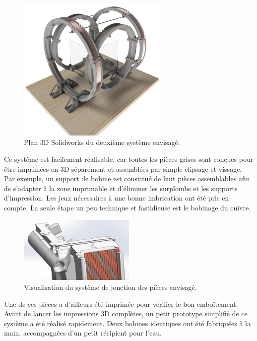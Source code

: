 \documentclass{article}
\begin{document}
    \begin{figure}[H]
        \centering
            \includegraphics[width = 0.65\textwidth]{Images/Proto2.PNG}
            \caption{Plan 3D Solidworks du deuxième système envisagé.}
            \label{fig:sytèmeV2}
        \end{figure}
\noindent
Ce système est facilement réalisable, car toutes les pièces grises sont conçues pour être imprimées en 3D séparément et assemblées par simple clipsage et vissage. Par exemple, un support de bobine est constitué de huit pièces assemblables afin de s'adapter à la zone imprimable et d'éliminer les surplombs et les supports d'impression. Les jeux nécessaires à une bonne imbrication ont été pris en compte. La seule étape un peu technique et fastidieuse est le bobinage du cuivre.
\begin{figure}[H]
        \centering
            \includegraphics[width = 0.5\textwidth]{Images/coupe_proto2.png}
            \caption{Visualisation du système de jonction des pièces envisagé.}
            \label{fig:sytèmeV2_img2}
        \end{figure}
\noindent
Une de ces pièces a d'ailleurs été imprimée pour vérifier le bon emboîtement.\\
Avant de lancer les impressions 3D complètes, un petit prototype simplifié de ce système a été réalisé rapidement. Deux bobines identiques ont été fabriquées à la main, accompagnées d'un petit récipient pour l'eau.
\end{document}
